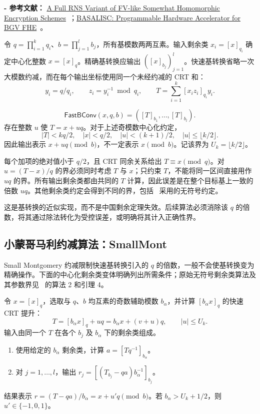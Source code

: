 \noindent \textbf{- 参考文献：} \href{https://eprint.iacr.org/2016/510}{A Full RNS Variant of FV-like Somewhat Homomorphic Encryption Schemes}~\cite{rns-bfv}；\href{https://eprint.iacr.org/2022/657}{BASALISC: Programmable Hardware Accelerator for BGV FHE}~\cite{rns-bfv2}。

令 $q=\prod_{i=1}^kq_i$、$b=\prod_{j=1}^lb_j$，所有基模数两两互素。输入剩余类 $x_i=[x]_{q_i}$ 确定中心化整数 $x=[x]_q$。精确基转换应输出 $([x]_{b_j})_{j=1}^l$。快速基转换省略一次大模数约减，而在每个输出坐标使用同一个未经约减的 CRT 和：
\[
y_i=q/q_i,\qquad z_i=y_i^{-1}\bmod q_i,\qquad
T=\sum_{i=1}^k[x_iz_i]_{q_i}y_i.
\]
\begin{tcolorbox}[title={\textbf{\tboxlabel{\ref*{subsec:rns-fastbconv}} 快速基转换：\textsf{FastBConv}}}]
\[
\textsf{FastBConv}(x,q,b)=([T]_{b_1},\ldots,[T]_{b_l}).
\]
存在整数 $u$ 使 $T=x+uq$。对于上述奇模数中心化约定，
\[
|T|<kq/2,\quad |x|<q/2,\quad |u|<(k+1)/2,
\quad |u|\leq\lfloor k/2\rfloor.
\]
因此输出表示 $x+uq\pmod b$，不一定表示 $x\pmod b$。记该界为 $U_k=\lfloor k/2\rfloor$。
\end{tcolorbox}

\begin{myproof}
每个加项的绝对值小于 $q/2$，且 CRT 同余关系给出 $T\equiv x\pmod q$。对 $u=(T-x)/q$ 的界必须同时考虑 $T$ 与 $x$；只约束 $T$，不能将同一区间直接用作 $uq$ 的界。所有输出剩余类都由共同的 $T$ 计算，因此误差是在整个目标基上一致的倍数 $uq$。其他剩余类约定会得到不同的界，包括~\cite{rns-bfv} 采用的无符号约定。
\end{myproof}

这是基转换的近似实现，而不是中国剩余定理失效。后续算法必须消除该 $q$ 的倍数，将其通过除法转化为受控误差，或明确将其计入正确性界。

\subsection{小蒙哥马利约减算法：\textsf{SmallMont}}
\label{subsec:rns-smallmont}

Small Montgomery 约减限制快速基转换引入的 $q$ 的倍数，一般不会使基转换变为精确操作。下面的中心化剩余类变体明确列出所需条件；原始无符号剩余类算法及其参数界见~\cite{rns-bfv} 的算法 2 和引理 4。

令 $x=[x]_q$，选取与 $q$、$b$ 均互素的奇数辅助模数 $b_\alpha$，并计算 $[b_\alpha x]_q$ 的快速 CRT 提升：
\[
T=[b_\alpha x]_q+uq=b_\alpha x+(v+u)q,
\qquad |u|\leq U_k.
\]
输入由同一个 $T$ 在各个 $b_j$ 及 $b_\alpha$ 下的剩余类组成。
\begin{tcolorbox}[title={\textbf{\tboxlabel{\ref*{subsec:rns-smallmont}} Small Montgomery 约减：\textsf{SmallMont}}}]
\begin{enumerate}
\item 使用给定的 $b_\alpha$ 剩余类，计算 $a=[Tq^{-1}]_{b_\alpha}$。
\item 对 $j=1,\ldots,l$，输出 $r_j=[(T_{b_j}-qa)b_\alpha^{-1}]_{b_j}$。
\end{enumerate}
结果表示 $r=(T-qa)/b_\alpha=x+u'q\pmod b$。若 $b_\alpha>U_k+1/2$，则 $u'\in\{-1,0,1\}$。
\end{tcolorbox}

